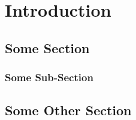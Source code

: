 \chapter{Introduction}

\lipsum[1-2]

\section{Some Section}
\lipsum[2]

\subsection{Some Sub-Section}

\lipsum[3]

\section{Some Other Section}

\lipsum[4-8]
